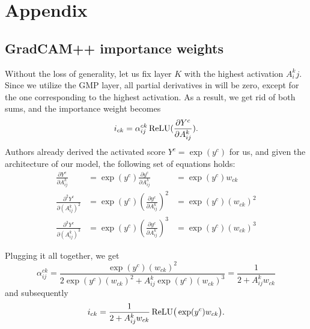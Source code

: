 \renewcommand{\thechapter}{A}
\chapter{Appendix}



\lstset{style=mystyle}

\section*{GradCAM++ importance weights}\label{sec:grad-cam-plus-plus-weight-derivation}

Without the loss of generality, let us fix layer $K$ with the highest activation $A^k_ij$.
Since we utilize the GMP layer, all partial derivatives in  will be zero, except for the one corresponding to the highest activation.
As a result, we get rid of both sums, and the importance weight becomes 
\begin{equation}
    i_{ck} = \alpha^{ck}_{ij} \operatorname{ReLU}(\frac{\partial Y^c}{\partial A^k_{ij}}).
\end{equation}
Authors already derived the activated score $Y^c = \exp(y^c)$ for us, and given the architecture of our model, the following set of equations holds:
\begin{equation}
\begin{aligned}
  \frac{\partial Y^c}{\partial A_{ij}^k}       &= \exp(y^c) \frac{\partial y^c}{\partial A_{ij}^k} &= \exp(y^c) w_{ck}     \\
  \frac{\partial^2 Y^c}{\partial (A_{ij}^k)^2} &= \exp(y^c) (\frac{\partial y^c}{\partial A_{ij}^k})^2 &= \exp(y^c) (w_{ck})^2 \\
  \frac{\partial^3 Y^c}{\partial (A_{ij}^k)^3} &= \exp(y^c) (\frac{\partial y^c}{\partial A_{ij}^k})^3 &= \exp(y^c) (w_{ck})^3
\end{aligned}
\end{equation}

Plugging it all together, we get 
\begin{equation}
    \alpha_{ij}^{ck} = \frac{\exp(y^c) (w_{ck})^2}{2 \exp(y^c) (w_{ck})^2 + A^k_{ij} \exp(y^c) (w_{ck})^3} = \frac{1}{2 + A^k_{ij}w_{ck}}
\end{equation}
and subsequently
\begin{equation}
    i_{ck} = \frac{1}{2 + A^k_{ij}w_{ck}} \operatorname{ReLU}\bigr(\exp(y^c)w_{ck}\bigl).
\end{equation}

